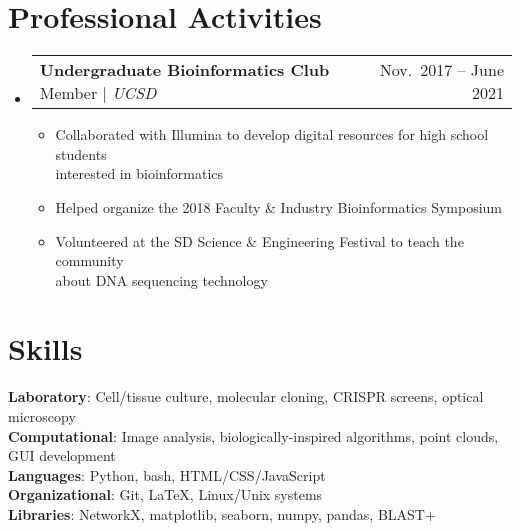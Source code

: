 \documentclass[letterpaper,11pt]{article}
\makeatletter
\newcommand{\resumeItem}[1]{
  \item\small{
    {#1 \vspace{-2pt}}
  }
}
\newcommand{\resumeProjectHeading}[2]{
    \item
    \begin{tabular*}{0.97\textwidth}{l@{\extracolsep{\fill}}r}
      \small#1 & #2 \\
    \end{tabular*}\vspace{-7pt}
}
\newcommand{\resumeSubHeadingListStart}{\begin{itemize}[leftmargin=0.15in, label={}]}
\newcommand{\resumeSubHeadingListEnd}{\end{itemize}}
\newcommand{\resumeItemListStart}{\begin{itemize}}
\newcommand{\resumeItemListEnd}{\end{itemize}\vspace{-5pt}}
\makeatother
\begin{document}
\section{Professional Activities}
  \resumeSubHeadingListStart
    \resumeProjectHeading
      {\textbf{Undergraduate Bioinformatics Club} Member $|$ \emph{UCSD}}{Nov.\ 2017 -- June 2021}
      {}{}
      \resumeItemListStart
        \resumeItem{Collaborated with Illumina to develop digital resources for high school students\\ interested in bioinformatics}
        \resumeItem{Helped organize the 2018 Faculty \& Industry Bioinformatics Symposium}
        \resumeItem{Volunteered at the SD Science \& Engineering Festival to teach the community\\ about DNA sequencing technology}
      \resumeItemListEnd
  \resumeSubHeadingListEnd

\section{Skills}
 \begin{itemize}[leftmargin=0.15in, label={}]
    \small{\item{
     \textbf{Laboratory}{: Cell/tissue culture, molecular cloning, CRISPR screens, optical microscopy} \\
     \textbf{Computational}{: Image analysis, biologically-inspired algorithms, point clouds, GUI development} \\
     \textbf{Languages}{: Python, bash, HTML/CSS/JavaScript} \\
     \textbf{Organizational}{: Git, \LaTeX, Linux/Unix systems} \\
     \textbf{Libraries}{: NetworkX, matplotlib, seaborn, numpy, pandas, BLAST+} \\}}
 \end{itemize}


\end{document}
